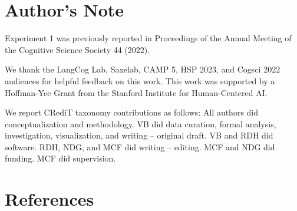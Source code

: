 \documentclass[
  english,
]{article}
\begin{document}
\section{Author's Note}\label{authors-note}

Experiment 1 was previously reported in Proceedings of the Annual Meeting of the Cognitive Science Society 44 (2022).

We thank the LangCog Lab, Saxelab, CAMP 5, HSP 2023, and Cogsci 2022 audiences for helpful feedback on this work. This work was supported by a Hoffman-Yee Grant from the Stanford Institute for Human-Centered AI.

We report CRediT taxonomy contributions as follows: All authors did conceptualization and methodology. VB did data curation, formal analysis, investigation, visualization, and writing -- original draft. VB and RDH did software. RDH, NDG, and MCF did writing -- editing. MCF and NDG did funding. MCF did supervision.

\section{References}\label{references}

\setlength{\parindent}{-0.1in} 
\setlength{\leftskip}{0.125in}

\noindent
\end{document}

